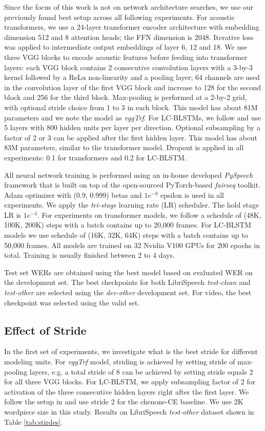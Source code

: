 \documentclass[a4paper]{article}
\begin{document}
Since the focus of this work is not on network architecture searches, we use our previously found best setup across all following experiments. For acoustic transformers, we use a 24-layer transformer encoder architecture with embedding dimension 512 and 8 attention heads; the FFN dimension is 2048. Iterative loss was applied to intermediate output embeddings of layer 6, 12 and 18. We use three VGG blocks \cite{simonyan2014very} to encode acoustic features before feeding into transformer layers: each VGG block contains 2 consecutive convolution layers with a 3-by-3 kernel followed by a ReLu non-linearity and a pooling layer; 64 channels are used in the convolution layer of the first VGG block and increase to 128 for the second block and 256 for the third block. Max-pooling is performed at a 2-by-2 grid, with optional stride choice from 1 to 3 in each block. This model has about 81M parameters and we note the model as \emph{vggTrf}. For LC-BLSTMs, we follow \cite{le2019senones} and use 5 layers with 800 hidden units per layer per direction. Optional subsampling by a factor of 2 or 3 can be applied after the first hidden layer. This model has about 83M parameters, similar to the transformer model. Dropout is applied in all experiments: 0.1 for transformers and 0.2 for LC-BLSTM. 

All neural network training is performed using an in-house developed \emph{PySpeech} framework that is built on top of the open-sourced PyTorch-based \emph{fairseq}\cite{ott2019fairseq} toolkit. Adam optimizer \cite{kingma2014adam} with (0.9, 0.999) betas and $1e^{-8}$ epsilon is used in all experiments. We apply the \emph{tri-stage}\cite{park2019specaugment} learning rate (LR) scheduler. The hold stage LR is $1e^{-3}$. For experiments on transformer models, we follow a schedule of (48K, 100K, 200K) steps with a batch contains up to 20,000 frames. For LC-BLSTM models we use schedule of (16K, 32K, 64K) steps with a batch contains up to 50,000 frames. All models are trained on 32 Nvidia V100 GPUs for 200 epochs in total. Training is usually finished between 2 to 4 days. 

Test set WERs are obtained using the best model based on evaluated WER on the development set. The best checkpoints for both LibriSpeech \emph{test-clean} and \emph{test-other} are selected using the \emph{dev-other} development set. For video, the best checkpoint was selected using the valid set.

\subsection{Effect of Stride}
\label{ssec:stride}
In the first set of experiments, we investigate what is the best stride for different modeling units. For \emph{vggTrf} model, striding is achieved by setting stride of max-pooling layers, e.g. a total stride of 8 can be achieved by setting stride equals 2 for all three VGG blocks. For LC-BLSTM, we apply subsampling factor of 2 for activation of the three consecutive hidden layers right after the first layer. We follow the setup in \cite{le2019senones} and use stride 2 for the chenone-CE baseline. We use 2K wordpiece size in this study. Results on LibriSpeech \emph{test-other} dataset shown in Table \ref{tab:stirdes}.
\end{document}
